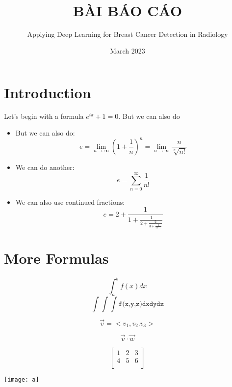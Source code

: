 \documentclass[11pt]{article}
\title{\LARGE BÀI BÁO CÁO}
\author{Applying Deep Learning for Breast Cancer Detection in Radiology}
\date{March 2023}
\begin{document}
\maketitle

\section*{Introduction}

Let's begin with a formula $e^{i\pi} + 1 = 0$. But we can also do
\begin{itemize}

    \item But we can also do:
$$e = \lim_{n\to\infty}\left(1 + \frac{1}{n}\right)^n =  \lim_{n\to\infty}\frac{n}{\sqrt[n]{n!}}$$

    \item We can do another:
$$e = \sum_{n=0}^{\infty} \frac{1}{n!}$$

    \item We can also use continued fractions:
$$e = 2 + \frac{1}{1 + \frac{1}{2 + \frac{2}{3 + \frac{3}{4 +\ddots}}}}$$


\end{itemize}

\section*{More Formulas}
$$\int_a^b f(x)dx$$
$$\int\int\int \texttt{f(x,y,z)dxdydz}$$

$$\vec{v}= <v_1, v_2. v_3> $$

$$\vec{v}\cdot \vec{w}$$

$$
\begin{bmatrix}

1 &2 &3\\
4 &5 &6\\
\end{bmatrix}
$$

\begin{center}
\texttt{[image: a]}
\end{center}
\end{document}
